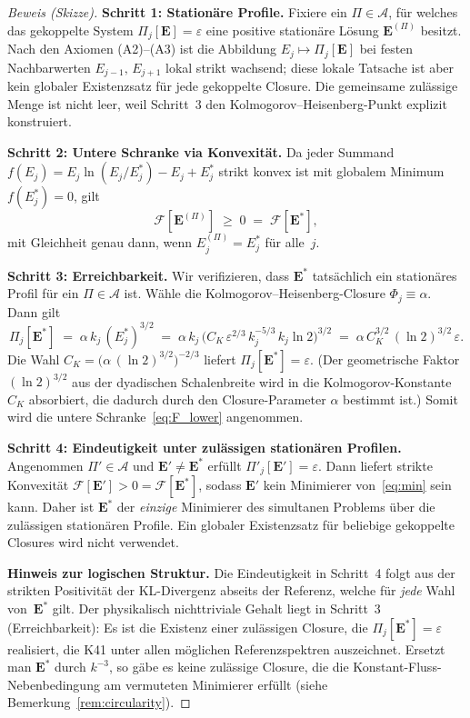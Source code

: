 \documentclass[12pt,a4paper]{article}
\theoremstyle{breakdef}
\theoremstyle{breakplain}
\theoremstyle{breakdef}
\begin{document}
\begin{proof}[Beweis (Skizze)]
\textbf{Schritt 1: Stationäre Profile.}\quad
Fixiere ein $\Pi \in \mathscr{A}$, für welches das gekoppelte System
$\Pi_j[\mathbf{E}] = \varepsilon$ eine positive stationäre Lösung
$\mathbf{E}^{(\Pi)}$ besitzt. Nach den Axiomen (A2)--(A3) ist die
Abbildung $E_j \mapsto \Pi_j[\mathbf{E}]$ bei festen Nachbarwerten
$E_{j-1},\,E_{j+1}$ lokal strikt wachsend; diese lokale Tatsache ist aber
kein globaler Existenzsatz für jede gekoppelte Closure. Die gemeinsame
zulässige Menge ist nicht leer, weil Schritt~3 den
Kolmogorov--Heisenberg-Punkt explizit konstruiert.

\textbf{Schritt 2: Untere Schranke via Konvexität.}\quad
Da jeder Summand $f(E_j) = E_j\ln(E_j/E_j^*) - E_j + E_j^*$ strikt
konvex ist mit globalem Minimum $f(E_j^*) = 0$, gilt
\begin{equation}\label{eq:F_lower}
  \mathcal{F}[\mathbf{E}^{(\Pi)}]
  \;\ge\; 0
  \;=\; \mathcal{F}[\mathbf{E}^*],
\end{equation}
mit Gleichheit genau dann, wenn $E_j^{(\Pi)} = E_j^*$ für alle~$j$.

\textbf{Schritt 3: Erreichbarkeit.}\quad
Wir verifizieren, dass $\mathbf{E}^*$ tatsächlich ein stationäres Profil
für ein $\Pi \in \mathscr{A}$ ist. Wähle die Kolmogorov--Heisenberg-Closure
$\Phi_j \equiv \alpha$. Dann gilt
\[
  \Pi_j[\mathbf{E}^*]
  \;=\; \alpha\,k_j\,(E_j^*)^{3/2}
  \;=\; \alpha\,k_j\,
    \bigl(C_K\,\varepsilon^{2/3}\,k_j^{-5/3}\,k_j\ln 2\bigr)^{3/2}
  \;=\; \alpha\,C_K^{3/2}\,(\ln 2)^{3/2}\,\varepsilon.
\]
Die Wahl $C_K = \bigl(\alpha\,(\ln 2)^{3/2}\bigr)^{-2/3}$ liefert
$\Pi_j[\mathbf{E}^*] = \varepsilon$. (Der geometrische Faktor $(\ln 2)^{3/2}$
aus der dyadischen Schalenbreite wird in die Kolmogorov-Konstante $C_K$
absorbiert, die dadurch durch den Closure-Parameter $\alpha$ bestimmt ist.)
Somit wird die untere Schranke~\eqref{eq:F_lower} angenommen.

\textbf{Schritt 4: Eindeutigkeit unter zulässigen stationären Profilen.}\quad
Angenommen $\Pi' \in \mathscr{A}$ und $\mathbf{E}' \ne \mathbf{E}^*$ erfüllt
$\Pi'_j[\mathbf{E}'] = \varepsilon$. Dann liefert strikte Konvexität
$\mathcal{F}[\mathbf{E}'] > 0 = \mathcal{F}[\mathbf{E}^*]$, sodass
$\mathbf{E}'$ kein Minimierer von~\eqref{eq:min} sein kann. Daher ist
$\mathbf{E}^*$ der \emph{einzige} Minimierer des simultanen Problems über
die zulässigen stationären Profile. Ein globaler Existenzsatz für
beliebige gekoppelte Closures wird nicht verwendet.

\smallskip\noindent
\textbf{Hinweis zur logischen Struktur.}\quad
Die Eindeutigkeit in Schritt~4 folgt aus der strikten Positivität der KL-Divergenz abseits der Referenz, welche für \emph{jede} Wahl von~$\mathbf{E}^*$ gilt. Der physikalisch nichttriviale Gehalt liegt in Schritt~3 (Erreichbarkeit): Es ist die Existenz einer zulässigen Closure, die $\Pi_j[\mathbf{E}^*] = \varepsilon$ realisiert, die K41 unter allen möglichen Referenzspektren auszeichnet. Ersetzt man $\mathbf{E}^*$ durch $k^{-3}$, so gäbe es keine zulässige Closure, die die Konstant-Fluss-Nebenbedingung am vermuteten Minimierer erfüllt (siehe Bemerkung~\ref{rem:circularity}).


\end{proof}
\end{document}
